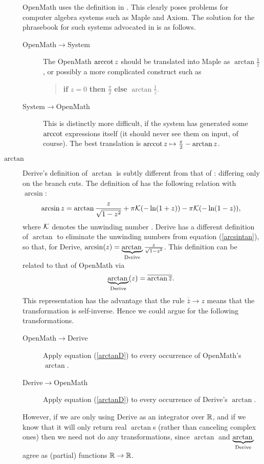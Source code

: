 \documentclass[report,keylogo]{openmath}
\begin{document}
\begin{description}
\begin{table}[t]
\mbox{}
\end{table} OpenMath uses the definition in
\cite[ninth printing]{AS}. This clearly poses problems for computer algebra
systems such as Maple and Axiom. The solution for the phrasebook for such
systems advocated in \cite{CDJW} is as follows.
\begin{description}
\item[OpenMath$\rightarrow$System]The OpenMath $\mathop{\rm arccot} z$ should be
translated into Maple as $\arctan\frac1z$, or possibly a more complicated
construct such as 
\begin{quote}
{\bf if} $z=0$ {\bf then} $\frac\pi2$ {\bf else} $\arctan\frac1z$. 
\end{quote}
\item[System$\rightarrow$OpenMath]This is distinctly more difficult, if the
system has generated some $\mathop{\rm arccot}$ expressions itself (it should never see
them on input, of course). The best translation is $\mathop{\rm arccot} z \mapsto
\frac\pi2-\arctan z$.
\end{description}
\item[$\arctan$]Derive's definition of $\arctan$ is subtly different from
that of \cite{AS}: differing only on the branch cuts. The definition of
\cite{AS} has the following relation with $\arcsin$:
\begin{equation}\label{arcsintan}
\arcsin z = \arctan\frac z{\sqrt{1-z^2}} +\pi\mathcal{K}(-\ln(1+z))-\pi\mathcal{K}(-\ln(1-z)),
\end{equation}
where $\mathcal{K}$ denotes the unwinding number \cite{CDJW}.
Derive has a different definition of $\arctan$ to eliminate the unwinding
numbers from equation (\ref{arcsintan}), so that, for Derive,
$\arcsin(z)=\underbrace{\mathop{\rm arctan}\nolimits{}}_{\mathop{\rm Derive}\nolimits}\frac
z{\sqrt{1-z^2}}$. This definition can be related to that of OpenMath via
\begin{equation}\label{arctanD}
\underbrace{\mathop{\rm arctan}\nolimits{}}_{\mathop{\rm Derive}\nolimits}(z)=\overline{\arctan\overline{z}}.
\end{equation}
This representation has the advantage that the rule
$\overline{\overline{z}}\rightarrow z$ means that the transformation is
self-inverse. Hence we could argue for the following transformations.
\begin{description}
\item[OpenMath$\rightarrow$Derive]Apply equation (\ref{arctanD}) to every
occurrence of OpenMath's $\arctan$.
\item[Derive$\rightarrow$OpenMath]Apply equation (\ref{arctanD}) to every
occurrence of Derive's $\arctan$.
\end{description}
However, if we are only using Derive as an integrator over $\mathbb{R}$, and if we
know that it will only return real $\arctan$s (rather than canceling
complex ones) then we need not do any transformations, since $\arctan$ and
$\underbrace{\mathop{\rm arctan}\nolimits{}}_{\mathop{\rm Derive}\nolimits}$ agree as (partial) functions $\mathbb{R}\rightarrow\mathbb{R}$.
\end{description}
\end{document}
